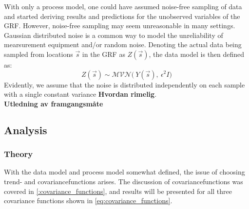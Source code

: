 With only a process model, one could have assumed noise-free sampling of data and started deriving results and predictions for the unobserved variables of the GRF. However, noise-free sampling may seem unreasonable in many settings. Gaussian distributed noise is a common way to model the unreliability of mearsurement equipment and/or random noise. Denoting the actual data being sampled from locations $\vec{s}$ in the GRF as $Z(\vec{s})$, the data model is then defined as:
\begin{equation}
Z(\vec{s}) \sim \mathcal{MVN} \big( \ Y(\vec{s}), \ \epsilon^2 I \big)
\end{equation}
Evidently, we assume that the noise is distributed independently on each sample with a single constant variance \textbf{Hvordan rimelig}. \\ 


\textbf{Utledning av framgangsmåte} \\
\subsection{Analysis}
\subsubsection{Theory}
With the data model and process model somewhat defined, the issue of choosing trend- and covariancefunctions arises. The discussion of covariancefunctions was covered in \ref{:covariance_functions}, and results will be presented for all three covariance functions shown in \ref{eq:covariance_functions}. \\ 

